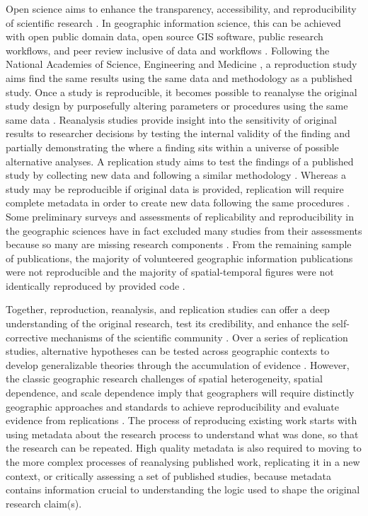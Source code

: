 \documentclass{isprs} %
\begin{document}
Open science aims to enhance the transparency, accessibility, and reproducibility of scientific research \citep{NASEM2018}.
In geographic information science, this can be achieved with open public domain data, open source GIS software, public research workflows, and peer review inclusive of data and workflows \citep{Singleton2016}. 
Following the National Academies of Science, Engineering and Medicine \citep{NASEM2019}, a reproduction study aims find the same results using the same data and methodology as a published study.
Once a study is reproducible, it becomes possible to reanalyse the original study design by purposefully altering parameters or procedures using the same same data \citep{Christensen2019}. 
Reanalysis studies provide insight into the sensitivity of original results to researcher decisions by testing the internal validity of the finding and partially demonstrating the where a finding sits within a universe of possible alternative analyses. 
A replication study aims to test the findings of a published study by collecting new data and following a similar methodology \citep{NASEM2019}.
Whereas a study may be reproducible if original data is provided, replication will require complete metadata in order to create new data following the same procedures \citep{Ostermann2017}.
Some preliminary surveys and assessments of replicability and reproducibility in the geographic sciences have in fact excluded many studies from their assessments because so many are missing research components \citep{Ostermann2017,Konkol2019}.
From the remaining sample of publications, the majority of volunteered geographic information publications were not reproducible \citep{Ostermann2017} and the majority of spatial-temporal figures were not identically reproduced by provided code \citep{Konkol2019}.

Together, reproduction, reanalysis, and replication studies can offer a deep understanding of the original research, test its credibility, and enhance the self-corrective mechanisms of the scientific community \citep{Christensen2019,NASEM2019}.
Over a series of replication studies, alternative hypotheses can be tested across geographic contexts to develop generalizable theories through the accumulation of evidence \citep{Kedron2022}.
However, the classic geographic research challenges of spatial heterogeneity, spatial dependence, and scale dependence imply that geographers will require distinctly geographic approaches and standards to achieve reproducibility \citep{Kedron2021,Brunsdon2020} and evaluate evidence from replications \citep{Kedron2022}.
The process of reproducing existing work starts with using metadata about the research process to understand what was done, so that the research can be repeated. 
High quality metadata is also required to moving to the more complex processes of reanalysing published work, replicating it in a new context, or critically assessing a set of published studies, because metadata contains information crucial to understanding the logic used to shape the original research claim(s).
\end{document}
